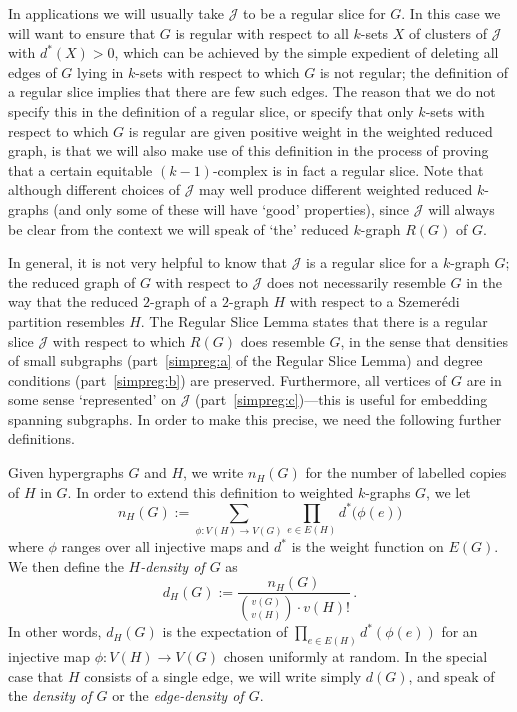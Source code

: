 \documentclass[12pt,a4paper]{amsart}
\newcommand{\cJ}{\mathcal{J}}
\newcommand{\reld}{d^*}
\begin{document}
In applications we will usually take $\cJ$ to be a regular slice for $G$. In
this case we will want to ensure that $G$ is regular with respect to all $k$-sets $X$ of clusters of $\cJ$
with $\reld(X) > 0$, which can be achieved by
the simple expedient of deleting all edges of $G$ lying in $k$-sets with respect to which $G$ is not regular; the definition of a regular slice implies that
there are few such edges. The reason that we do not specify this in the definition
of a regular slice, or specify that only $k$-sets with respect to which $G$ is regular are given
positive weight in the weighted reduced graph, is that we will also make use of this definition in the process
of proving that a certain equitable $(k-1)$-complex is in fact a regular slice.
Note that although different choices of $\cJ$ may well produce different
weighted reduced $k$-graphs (and only some of these will have `good'
properties), since $\cJ$ will always be clear from the context we will speak of
`the' reduced $k$-graph $R(G)$ of $G$.

In general, it is not very helpful to know that $\cJ$ is a regular slice for a
$k$-graph $G$;
the reduced graph of $G$ with respect to $\cJ$ does not necessarily resemble $G$ in the way that the reduced $2$-graph of a $2$-graph $H$ with respect to a Szemer\'edi partition resembles $H$. The Regular Slice Lemma states that there is a regular slice $\cJ$ with respect to which $R(G)$ does resemble $G$, in the sense that densities of small subgraphs (part~\ref{simpreg:a} of the Regular Slice Lemma) and degree conditions (part~\ref{simpreg:b}) are preserved. Furthermore, all vertices of $G$ are in some sense `represented' on $\cJ$ (part~\ref{simpreg:c})---this is useful for embedding spanning subgraphs.
In order to make this precise, we need the following further definitions.

Given hypergraphs $G$ and $H$, we write $n_H(G)$ for the number of labelled
copies of $H$ in $G$.
In order to extend this definition to weighted $k$-graphs
$G$, we let \[n_H(G):=\sum_{\phi:V(H)\to V(G)}\prod_{e\in
E(H)}\reld\big(\phi(e)\big)\] where $\phi$ ranges over all injective maps and
$\reld$ is the weight function on $E(G)$. We then define the \emph{$H$-density
of $G$} as \[d_H(G):=\frac{n_H(G)}{\binom{v(G)}{v(H)}\cdot v(H)!}\,. \] In
other words, $d_H(G)$ is the expectation of $\prod_{e\in E(H)}\reld (\phi(e))$
for an injective map $\phi:V(H)\to V(G)$ chosen uniformly at random. In the
special case that $H$ consists of a single edge, we will write simply $d(G)$,
and speak of the \emph{density of $G$} or the \emph{edge-density of $G$}.
\end{document}
